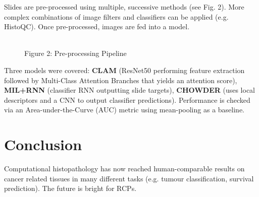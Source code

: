 \documentclass[a4paper, 10pt]{article}
\begin{document}
Slides are pre-processed using multiple, successive methods (see Fig. 2). More complex combinations of image filters and classifiers can be applied (e.g. HistoQC). Once pre-processed, images are fed into a model.
\\
\begin{figure}
\centering
{}%
\raisebox{-4ex}{$\to$}%
%
\raisebox{-4ex}{$\to$}%
\raisebox{-4ex}{$\to$}%
\\{\scriptsize Figure 2: Pre-processing Pipeline}
\end{figure}

Three models were covered: \textbf{CLAM} (ResNet50 performing feature extraction followed by Multi-Class Attention Branches that yields an attention score), \textbf{MIL+RNN} (classifier RNN outputting slide targets), \textbf{CHOWDER} (uses local descriptors and a CNN to output classifier predictions). Performance is checked via an Area-under-the-Curve (AUC) metric using mean-pooling as a baseline.

\section{Conclusion}

Computational histopathology has now reached human-comparable results on cancer related tissues in many different tasks (e.g. tumour classification, survival prediction). The future is bright for RCPs.
\end{document}
